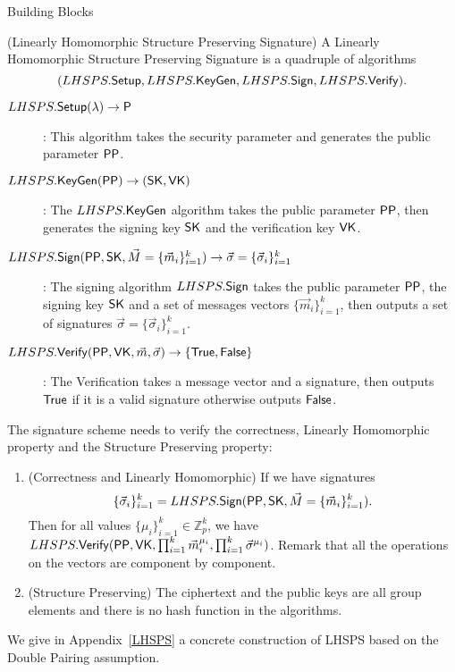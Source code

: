 \begin{subsection}{Building Blocks}
  \begin{myDef}{(Linearly Homomorphic Structure Preserving Signature)}
    A Linearly Homomorphic Structure Preserving Signature is a quadruple of algorithms
    $$(LHSPS.{\mathsf{Setup}}, LHSPS.{\mathsf{KeyGen}}, LHSPS.{\mathsf{Sign}}, LHSPS.{\mathsf{Verify}}).$$
    \begin{description}
    \item[$\boldmath{LHSPS.{\mathsf{Setup}}(\lambda) \to \mathsf{P}}$]: This algorithm takes the security parameter and generates the public parameter $\mathsf{PP}$.
    \item[$\boldmath{LHSPS.{\mathsf{KeyGen}}(\mathsf{PP}) \to (\mathsf{SK}, \mathsf{VK})}$]: The $LHSPS.{\mathsf{KeyGen}}$ algorithm takes the public parameter $\mathsf{PP}$, then generates the signing key $\mathsf{SK}$ and the verification key $\mathsf{VK}$.
    \item[$\boldmath{LHSPS.{\mathsf{Sign}}(\mathsf{PP}, \mathsf{SK}, \vec{M} = \{\vec{m}_i\}_{i=1}^k) \to \vec{\sigma} = \{\vec{\sigma}_i\}_{i=1}^k}$]: The signing algorithm $LHSPS.{\mathsf{Sign}}$ takes the public parameter $\mathsf{PP}$, the signing key $\mathsf{SK}$ and a set of messages vectors $\{\vec{m}_i\}_{i=1}^k$, then outputs a set of signatures $\vec{\sigma} = \{\vec{\sigma}_i\}_{i=1}^k$.
    \item[$\boldmath{LHSPS.{\mathsf{Verify}}(\mathsf{PP}, \mathsf{VK}, \vec{m}, \vec{\sigma})} \to \{\mathsf{True}, \mathsf{False}\}$]: The Verification takes a message vector and a signature, then outputs $\mathsf{True}$ if it is a valid signature otherwise outputs $\mathsf{False}$.
    \end{description}

    The signature scheme needs to verify the correctness, Linearly Homomorphic property and the Structure Preserving property:
    \begin{enumerate}
    \item (Correctness and Linearly Homomorphic) If we have signatures
      $$\{\vec{\sigma}_i\}_{i=1}^k = LHSPS.{\mathsf{Sign}}(\mathsf{PP}, \mathsf{SK}, \vec{M} = \{\vec{m}_i\}_{i=1}^k).$$
      Then for all values $\{\mu_i\}_{i = 1}^k \in \mathbb{Z}_p^k$,
      we have $LHSPS.{\mathsf{Verify}}(\mathsf{PP}, \mathsf{VK}, \prod_{i=1}^k\vec{m}_i^{\mu_i}, \prod_{i=1}^k\vec{\sigma}^{\mu_i})$. Remark that all the operations on the vectors are component by component.
    \item (Structure Preserving) The ciphertext and the public keys are all group elements and there is no hash function in the algorithms.
    \end{enumerate}
  \end{myDef}

  We give in Appendix~\ref{LHSPS} a concrete construction of LHSPS based on the Double Pairing assumption.


\end{subsection}
